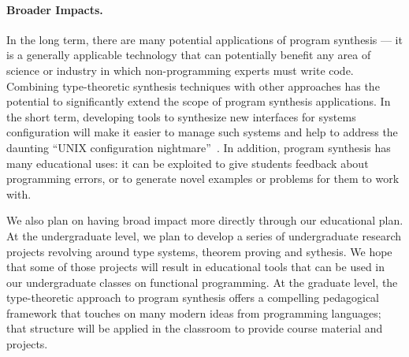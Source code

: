 

\paragraph{Broader Impacts.} In the long term, there are many potential
applications of program synthesis --- it is a generally applicable
technology that can potentially benefit any area of science or
industry in which non-programming experts must write code. Combining
type-theoretic synthesis techniques with other approaches has the
potential to significantly extend the scope of program synthesis
applications.  In the short term, developing tools to synthesize new
interfaces for systems configuration will make it easier to manage
such systems and help to address 
the daunting ``UNIX configuration nightmare''~\cite{unix-config-nightmare}.
In addition, program synthesis has many
educational uses: it can be exploited to give students feedback about
programming errors, or to generate novel examples or problems for them
to work with.  

We also plan on having broad impact more directly through our educational plan.
At the undergraduate level, we plan to develop a series of undergraduate
research projects revolving around type systems, theorem proving and sythesis.
We hope that some of those projects will result in educational tools
that can be used in our undergraduate classes on functional programming.
At the graduate level, the type-theoretic approach to program synthesis 
offers a compelling pedagogical framework that touches on many modern
ideas from programming languages; that structure will be applied in
the classroom to provide course material and projects.  

